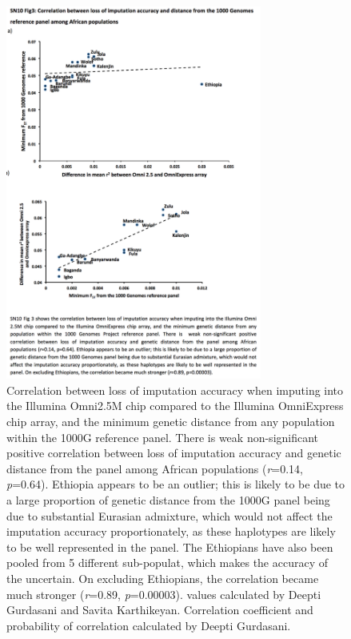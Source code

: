 \begin{figure}
\centering
\includegraphics[trim={0.5cm 6.5cm 0cm 15cm},clip,width=0.75\textwidth]{fig/SN10f3}
\caption[Loss of imputation accuracy upon thinning to an OmniExpress subset of \glspl{SNP} as a function of .]{Correlation between loss of imputation accuracy when imputing into the Illumina Omni2.5M chip compared to the Illumina OmniExpress chip array, and the minimum genetic distance from any population within the \gls{1000G} reference panel. There is weak non-significant positive correlation between loss of imputation accuracy and genetic distance from the panel among African populations (\textit{r}=0.14, \textit{p}=0.64). Ethiopia appears to be an outlier; this is likely to be due to a large proportion of genetic distance from the \gls{1000G} panel being due to substantial Eurasian admixture, which would not affect the imputation accuracy proportionately, as these haplotypes are likely to be well represented in the panel. The Ethiopians have also been pooled from 5 different sub-populat, which makes the accuracy of the  uncertain. On excluding Ethiopians, the correlation became much stronger (\textit{r}=0.89, \textit{p}=0.00003).  values calculated by Deepti Gurdasani and Savita Karthikeyan. Correlation coefficient and probability of correlation calculated by Deepti Gurdasani.}
\label{fig:SN10f3}
\end{figure}